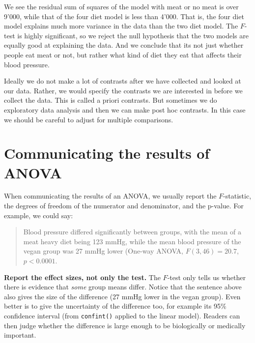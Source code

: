 \documentclass[
  letterpaper,
  8pt,
  a4paper]{book}
\begin{document}
We see the residual sum of squares of the model with meat or no meat is
over 9'000, while that of the four diet model is less than 4'000. That
is, the four diet model explains much more variance in the data than the
two diet model. The \(F\)-test is highly significant, so we reject the
null hypothesis that the two models are equally good at explaining the
data. And we conclude that its not just whether people eat meat or not,
but rather what kind of diet they eat that affects their blood pressure.

Ideally we do not make a lot of contrasts after we have collected and
looked at our data. Rather, we would specify the contrasts we are
interested in before we collect the data. This is called a priori
contrasts. But sometimes we do exploratory data analysis and then we can
make post hoc contrasts. In this case we should be careful to adjust for
multiple comparisons.

\section*{Communicating the results of
ANOVA}\label{communicating-the-results-of-anova}


When communicating the results of an ANOVA, we usually report the
\(F\)-statistic, the degrees of freedom of the numerator and
denominator, and the p-value. For example, we could say:

\begin{quote}
Blood pressure differed significantly between groups, with the mean of a
meat heavy diet being 123 mmHg, while the mean blood pressure of the
vegan group was 27 mmHg lower (One-way ANOVA, \(F(3, 46) = 20.7\),
\(p < 0.0001\).
\end{quote}

\begin{tcolorbox}[enhanced jigsaw, arc=.35mm, bottomrule=.15mm, bottomtitle=1mm, breakable, colback=white, colbacktitle=quarto-callout-tip-color!10!white, colframe=quarto-callout-tip-color-frame, coltitle=black, left=2mm, leftrule=.75mm, opacityback=0, opacitybacktitle=0.6, rightrule=.15mm, title=\textcolor{quarto-callout-tip-color}{\faLightbulb}\hspace{0.5em}{Tip}, titlerule=0mm, toprule=.15mm, toptitle=1mm]

\textbf{Report the effect sizes, not only the test.} The \(F\)-test only
tells us whether there is evidence that \emph{some} group means differ.
Notice that the sentence above also gives the size of the difference (27
mmHg lower in the vegan group). Even better is to give the uncertainty
of the difference too, for example its 95\% confidence interval (from
\texttt{confint()} applied to the linear model). Readers can then judge
whether the difference is large enough to be biologically or medically
important.

\end{tcolorbox}
\end{document}
